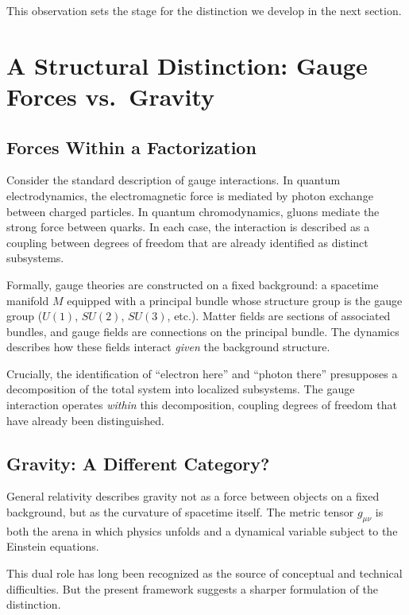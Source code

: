 \documentclass[12pt,a4paper,openany]{book}
\begin{document}
This observation sets the stage for the distinction we develop in the next section.

\section{A Structural Distinction: Gauge Forces vs.\ Gravity}
\label{H-D-sec:distinction}

\subsection{Forces Within a Factorization}

Consider the standard description of gauge interactions. In quantum electrodynamics, the electromagnetic force is mediated by photon exchange between charged particles. In quantum chromodynamics, gluons mediate the strong force between quarks. In each case, the interaction is described as a coupling between degrees of freedom that are already identified as distinct subsystems.

Formally, gauge theories are constructed on a fixed background: a spacetime manifold $M$ equipped with a principal bundle whose structure group is the gauge group ($U(1)$, $SU(2)$, $SU(3)$, etc.). Matter fields are sections of associated bundles, and gauge fields are connections on the principal bundle. The dynamics describes how these fields interact \emph{given} the background structure.

Crucially, the identification of ``electron here'' and ``photon there'' presupposes a decomposition of the total system into localized subsystems. The gauge interaction operates \emph{within} this decomposition, coupling degrees of freedom that have already been distinguished.

\subsection{Gravity: A Different Category?}

General relativity describes gravity not as a force between objects on a fixed background, but as the curvature of spacetime itself. The metric tensor $g_{\mu\nu}$ is both the arena in which physics unfolds and a dynamical variable subject to the Einstein equations.

This dual role has long been recognized as the source of conceptual and technical difficulties. But the present framework suggests a sharper formulation of the distinction.
\end{document}
